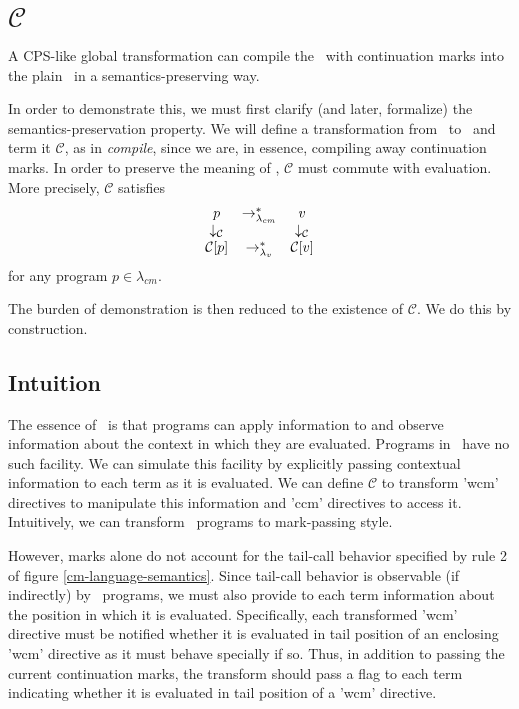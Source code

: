\chapter{$\mathcal{C}$}

A CPS-like global transformation can compile the \lc\ with continuation marks into
the plain \lc\ in a semantics-preserving way.

In order to demonstrate this, we must first clarify (and later, formalize) the semantics-preservation property. We will define a transformation from \cm\ to \lv\ and term it $\mathcal{C}$, as in \emph{compile}, since we are, in essence, compiling away continuation marks. In order to preserve the meaning of \cm, $\mathcal{C}$ must commute with evaluation. More precisely, $\mathcal{C}$ satisfies
\[
\begin{array}{ccc}
p & \rightarrow_{\lambda_{cm}}^{*} & v\\
\downarrow_\mathcal{C} & & \downarrow_\mathcal{C}\\
\mathcal{C}[p] & \rightarrow_{\lambda_v}^{*} & \mathcal{C}[v]
\end{array}
\]
for any program $p\in\lambda_{cm}$.

The burden of demonstration is then reduced to the existence of $\mathcal{C}$. We do this by construction.

\section{Intuition}

The essence of \cm\ is that programs can apply information to and observe information about the context in which they are evaluated. Programs in \lv\ have no such facility. We can simulate this facility by explicitly passing contextual information to each term as it is evaluated. We can define $\mathcal{C}$ to transform \scheme'wcm' directives to manipulate this information and \scheme'ccm' directives to access it. Intuitively, we can transform \cm\ programs to mark-passing style.

However, marks alone do not account for the tail-call behavior specified by rule 2 of figure \ref{cm-language-semantics}. Since tail-call behavior is observable (if indirectly) by \cm\ programs, we must also provide to each term information about the position in which it is evaluated. Specifically, each transformed \scheme'wcm' directive must be notified whether it is evaluated in tail position of an enclosing \scheme'wcm' directive as it must behave specially if so. Thus, in addition to passing the current continuation marks, the transform should pass a flag to each term indicating whether it is evaluated in tail position of a \scheme'wcm' directive.

